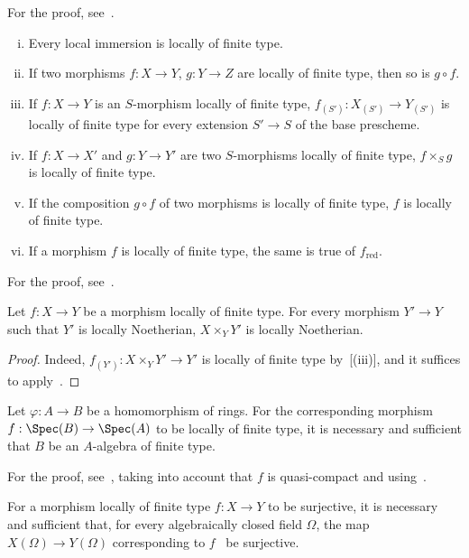 For the proof, see~.

\begin{proposition}[1.3.4]
\label{IV.1.3.4}
\medskip\noindent
\begin{enumerate}[(i)]
  \item Every local immersion is locally of finite type.
  \item If two morphisms $f:X\to Y$, $g:Y\to Z$ are locally of finite type, then so is $g\circ f$.
  \item If $f:X\to Y$ is an $S$-morphism locally of finite type, $f_{(S')}:X_{(S')}\to Y_{(S')}$ is
    locally of finite type for every extension $S'\to S$ of the base prescheme.
  \item If $f:X\to X'$ and $g:Y\to Y'$ are two $S$-morphisms locally of finite type, $f\times_S g$
    is locally of finite type.
  \item If the composition $g\circ f$ of two morphisms is locally of finite type, $f$ is locally of
    finite type.
  \item If a morphism $f$ is locally of finite type, the same is true of $f_{\mathrm{red}}$.
\end{enumerate}
\end{proposition}

For the proof, see~.

\begin{corollary}[1.3.5]
\label{IV.1.3.5}
Let $f:X\to Y$ be a morphism locally of finite type. For every
morphism $Y'\to Y$ such that $Y'$ is locally Noetherian, $X\times_Y Y'$ is locally Noetherian.
\end{corollary}

\begin{proof}
Indeed, $f_{(Y')}:X\times_Y Y'\to Y'$ is locally of finite type by~[(iii)], and it
suffices to apply~.
\end{proof}

\begin{proposition}[1.3.6]
\label{IV.1.3.6}
Let $\varphi:A\to B$ be a homomorphism of rings. For the
corresponding morphism $f:\Spec(B)\to\Spec(A)$ to be locally of finite type, it is necessary and sufficient
that $B$ be an $A$-algebra of finite type.
\end{proposition}

For the proof, see~, taking into account that $f$ is quasi-compact and using~.

\begin{proposition}[1.3.7]
\label{IV.1.3.7}
For a morphism locally of finite type $f:X\to Y$ to be
surjective, it is necessary and sufficient that, for every algebraically closed field $\Omega$, the map $X(\Omega)\to Y(\Omega)$
corresponding to $f$~ be surjective.
\end{proposition}

